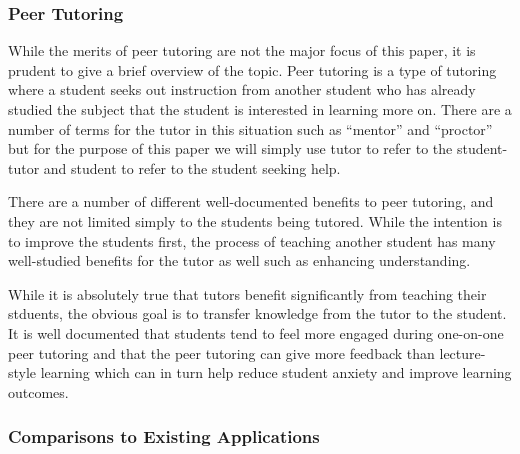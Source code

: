 \subsubsection{Peer Tutoring}
\label{peer-tutoring}
While the merits of peer tutoring are not the major focus of this paper, it is
prudent to give a brief overview of the topic. Peer tutoring is a type of
tutoring where a student seeks out instruction from another student who has
already studied the subject that the student is interested in learning more on.
There are a number of terms for the tutor in this situation such as ``mentor''
and ``proctor'' but for the purpose of this paper we will simply use tutor to
refer to the student-tutor and student to refer to the student seeking help.
\cite{kim}

There are a number of different well-documented benefits to peer tutoring, and
they are not limited simply to the students being tutored. While the intention
is to improve the students first, the process of teaching another student has
many well-studied benefits for the tutor as well such as enhancing
understanding. \cite{kim}

While it is absolutely true that tutors benefit significantly from teaching
their stduents, the obvious goal is to transfer knowledge from the tutor to the
student. It is well documented that students tend to feel more engaged during
one-on-one peer tutoring and that the peer tutoring can give more feedback than
lecture-style learning which can in turn help reduce student anxiety and improve
learning outcomes. \cite{topping}

\subsubsection{Comparisons to Existing Applications}
\label{comparisons}


